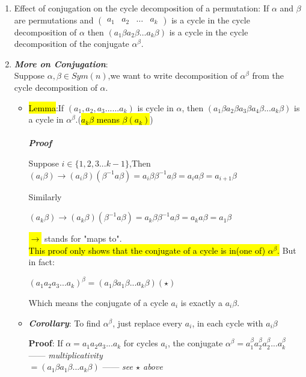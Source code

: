 \documentclass{article}
\begin{document}
\begin{enumerate}
    \item Effect of conjugation on the cycle decomposition of a permutation: If $\alpha$ and $\beta$ are permutations and $\left(\begin{array}{llll}a_{1} & a_{2} & \ldots & a_{k}\end{array}\right)$ is a cycle in the cycle decomposition of $\alpha$ then $\left(a_{1} \beta a_{2} \beta \ldots a_{k} \beta\right)$ is a cycle in the cycle decomposition of the conjugate $\alpha^{\beta}$.
    \item \textbf{\textit{More on Conjugation}}: \\Suppose $\alpha,\beta \in Sym(n)$,we want to write decomposition of $\alpha^{\beta}$
    from the cycle decomposition of $\alpha$.
    \begin{itemize}
        \item \hl{Lemma}:If $(a_1,a_2,a_3 ...... a_k)$ is cycle in $\alpha$,
        then $(a_1\beta a_2\beta a_3\beta a_4\beta ... a_k\beta)$ is a cycle in $\alpha^{\beta}$.(\hl{$a_k \beta$ means $\beta(a_k)$})
        \\\\\textbf{\textit{Proof}}
        \begin{center}
            Suppose $i \in \{1,2,3 ... k-1\}$,Then\\
            $(a_i \beta) \rightarrow (a_i \beta)(\beta^{-1}a \beta) = a_i \beta \beta^{-1} a \beta
            = a_i a \beta = a_{i+1} \beta$
        \end{center}
        Similarly
        \begin{center}
            $(a_k \beta) \rightarrow (a_k \beta)(\beta^{-1}a \beta) = a_k \beta \beta^{-1} a \beta
            = a_k a \beta = a_1 \beta$
        \end{center}
        \hl{$\rightarrow$} stands for "maps to".
        \\\hl{This proof only shows that the conjugate of a cycle is in(one of) $\alpha^{\beta}$. }
        But in fact:
        \begin{center}
            $(a_1a_2a_3...a_k)^{\beta} = (a_1\beta a_1\beta ... a_k\beta) (\star)$
        \end{center}
        Which means the conjugate of a cycle $a_i$ is exactly a $a_i \beta$.
    \item \textbf{\textit{Corollary}}: To find $\alpha^{\beta}$, just replace every $a_i$, in each cycle with $a_i \beta$
        \begin{center}
            \textbf{Proof}: If $\alpha = a_1 a_2 a_3... a_k$ for cycles $a_i$, 
            the conjugate $\alpha ^{\beta} = a_1 ^{\beta} a_2 ^{\beta} a_2 ^{\beta} ... a_k ^{\beta}$ ------ \textit{multiplicativity}
            \\$= (a_1\beta a_1\beta ... a_k\beta)$ ------ \textit{see $\star$ above}

        \end{center}
    
    \end{itemize}


\end{enumerate}
\end{document}
